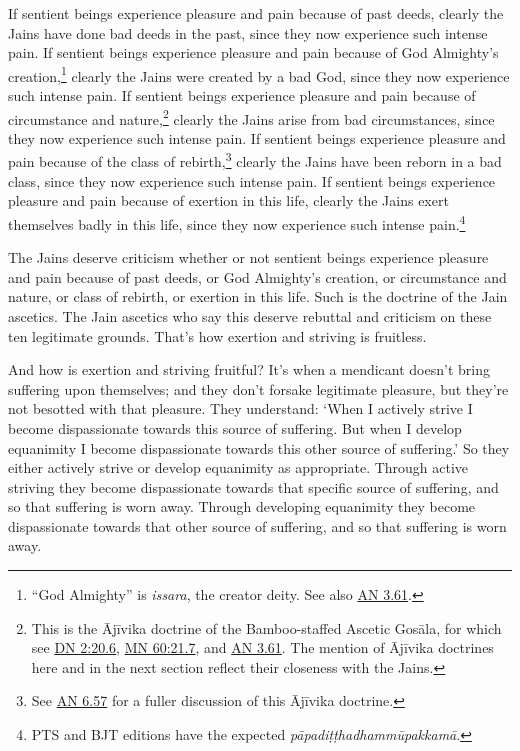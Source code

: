 \documentclass[12pt,openany]{book}%
\begin{document}
If sentient beings experience pleasure and pain because of past deeds, clearly the Jains have done bad deeds in the past, since they now experience such intense pain. If sentient beings experience pleasure and pain because of God Almighty’s creation,\footnote{“God Almighty” is \textit{issara}, the creator deity. See also \href{https://suttacentral.net/an3.61/en/sujato}{AN 3.61}. } clearly the Jains were created by a bad God, since they now experience such intense pain. If sentient beings experience pleasure and pain because of circumstance and nature,\footnote{This is the \textsanskrit{Ājīvika} doctrine of the Bamboo-staffed Ascetic \textsanskrit{Gosāla}, for which see \href{https://suttacentral.net/dn2/en/sujato\#20.6}{DN 2:20.6}, \href{https://suttacentral.net/mn60/en/sujato\#21.7}{MN 60:21.7}, and \href{https://suttacentral.net/an3.61/en/sujato}{AN 3.61}. The mention of \textsanskrit{Ājīvika} doctrines here and in the next section reflect their closeness with the Jains. } clearly the Jains arise from bad circumstances, since they now experience such intense pain. If sentient beings experience pleasure and pain because of the class of rebirth,\footnote{See \href{https://suttacentral.net/an6.57/en/sujato}{AN 6.57} for a fuller discussion of this \textsanskrit{Ājīvika} doctrine. } clearly the Jains have been reborn in a bad class, since they now experience such intense pain. If sentient beings experience pleasure and pain because of exertion in this life, clearly the Jains exert themselves badly in this life, since they now experience such intense pain.\footnote{PTS and BJT editions have the expected \textit{\textsanskrit{pāpadiṭṭhadhammūpakkamā}}. } 

The Jains deserve criticism whether or not sentient beings experience pleasure and pain because of past deeds, or God Almighty’s creation, or circumstance and nature, or class of rebirth, or exertion in this life. Such is the doctrine of the Jain ascetics. The Jain ascetics who say this deserve rebuttal and criticism on these ten legitimate grounds. That’s how exertion and striving is fruitless. 

And how is exertion and striving fruitful? It’s when a mendicant doesn’t bring suffering upon themselves; and they don’t forsake legitimate pleasure, but they’re not besotted with that pleasure. They understand: ‘When I actively strive I become dispassionate towards this source of suffering. But when I develop equanimity I become dispassionate towards this other source of suffering.’ So they either actively strive or develop equanimity as appropriate. Through active striving they become dispassionate towards that specific source of suffering, and so that suffering is worn away. Through developing equanimity they become dispassionate towards that other source of suffering, and so that suffering is worn away. 
\end{document}

